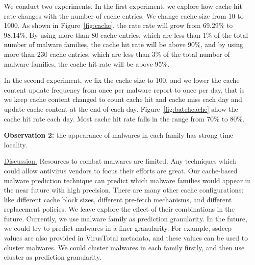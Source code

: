 We conduct two experiments. In the first experiment, 
we explore how cache hit rate changes with the number of cache entries. 
We change cache size from 10 to 1000. As shown in Figure~\ref{fig:cache}, 
the rate rate will grow from 69.29\% to 98.14\%. 
By using more than 80 cache entries, which are less than 1\% of the total number of malware families, the cache hit rate will be above 90\%, 
and by using more than 230 cache entries, which are less than 3\% of the total number of malware families, 
the cache hit rate will be above 95\%. 

In the second experiment, we fix the cache size to 100, 
and we lower the cache content update frequency from once per malware report to once per day, 
that is we keep cache content changed to count cache hit and cache miss each day and update cache content at the end of each day.
Figure~\ref{fig:batchcache} show the cache hit rate each day. 
Most cache hit rate falls in the range from 70\% to 80\%.  


{\bf Observation 2:} 
the appearance of malwares in each family has strong time locality.  

\underline{Discussion.}
Resources to combat malwares are limited. 
Any techniques which could allow antivirus vendors to focus their efforts are great. 
Our cache-based malware prediction technique can predict which malware families would appear in the near future with high precision. 
There are many other cache configurations: 
like different cache block sizes, different pre-fetch mechanisms, 
and different replacement policies. We leave explore the effect of their combinations in the future. 
Currently, we use malware family as prediction granularity. 
In the future, we could try to predict malwares in a finer granularity. 
For example, ssdeep values are also provided in VirusTotal metadata, 
and these values can be used to cluster malwares. 
We could cluster malwares in each family firstly, and then use cluster as prediction granularity. 
